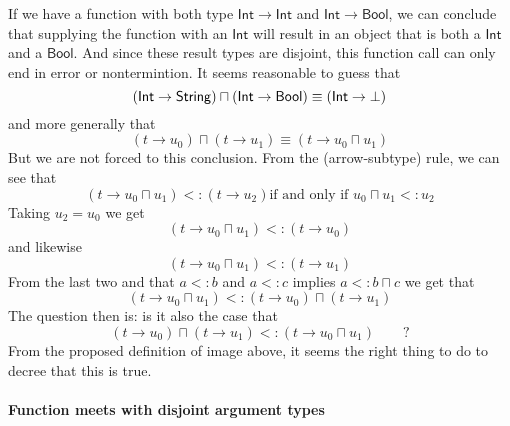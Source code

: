 \documentclass[12pt]{article}
\begin{document}
If we have a function with both type $\mathsf{Int}\rightarrow \mathsf{Int}$
and $\mathsf{Int}\rightarrow \mathsf{Bool}$, we can conclude that supplying
the function with an $\mathsf{Int}$ will result in an object that is both a $%
\mathsf{Int}$ and a $\mathsf{Bool}$. And since these result types are
disjoint, this function call can only end in error or nontermintion. It
seems reasonable to guess that%
\begin{equation*}
\left( \mathsf{Int}\rightarrow \mathsf{String}\right) \sqcap \left( \mathsf{%
Int}\rightarrow \mathsf{Bool}\right) \equiv \left( \mathsf{Int}\rightarrow
\bot \right) 
\end{equation*}%
and more generally that 
\begin{equation*}
\left( t\rightarrow u_{0}\right) \sqcap \left( t\rightarrow u_{1}\right)
\equiv \left( t\rightarrow u_{0}\sqcap u_{1}\right) 
\end{equation*}%
But we are not forced to this conclusion. From the (arrow-subtype) rule, we
can see that%
\begin{equation*}
\left. \left( t\rightarrow u_{0}\sqcap u_{1}\right) <:\left( t\rightarrow
u_{2}\right) \right. \text{if and only if }u_{0}\sqcap u_{1}<:u_{2}
\end{equation*}%
Taking $u_{2}=u_{0}$ we get%
\begin{equation*}
\left( t\rightarrow u_{0}\sqcap u_{1}\right) <:\left( t\rightarrow
u_{0}\right) 
\end{equation*}%
and likewise%
\begin{equation*}
\left( t\rightarrow u_{0}\sqcap u_{1}\right) <:\left( t\rightarrow
u_{1}\right) 
\end{equation*}%
From the last two and that $a<:b$ and $a<:c$ implies $a<:b\sqcap c$ we get
that%
\begin{equation*}
\left( t\rightarrow u_{0}\sqcap u_{1}\right) <:\left( t\rightarrow
u_{0}\right) \sqcap \left( t\rightarrow u_{1}\right) 
\end{equation*}%
The question then is: is it also the case that 
\begin{equation*}
\left( t\rightarrow u_{0}\right) \sqcap \left( t\rightarrow u_{1}\right)
<:\left( t\rightarrow u_{0}\sqcap u_{1}\right) \qquad \text{?}
\end{equation*}%
From the proposed definition of image above, it seems the right thing to do
to decree that this is true.

\paragraph{Function meets with disjoint argument types}
\end{document}
